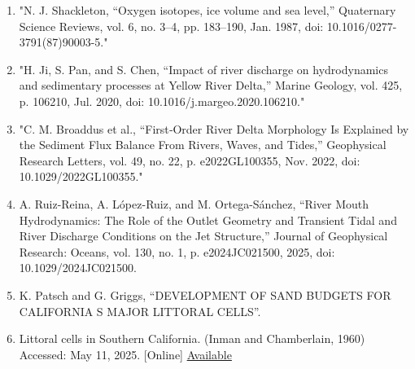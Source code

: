 \documentclass{article}
\begin{document}
\begin{enumerate}
    \item {"N. J. Shackleton, “Oxygen isotopes, ice volume and sea level,” Quaternary Science Reviews, vol. 6, no. 3–4, pp. 183–190, Jan. 1987, doi: 10.1016/0277-3791(87)90003-5."}

    \item {"H. Ji, S. Pan, and S. Chen, “Impact of river discharge on hydrodynamics and sedimentary processes at Yellow River Delta,” Marine Geology, vol. 425, p. 106210, Jul. 2020, doi: 10.1016/j.margeo.2020.106210."}

    \item{"C. M. Broaddus et al., “First‐Order River Delta Morphology Is Explained by the Sediment Flux Balance From Rivers, Waves, and Tides,” Geophysical Research Letters, vol. 49, no. 22, p. e2022GL100355, Nov. 2022, doi: 10.1029/2022GL100355."}

    \item{A. Ruiz-Reina, A. López-Ruiz, and M. Ortega-Sánchez, “River Mouth Hydrodynamics: The Role of the Outlet Geometry and Transient Tidal and River Discharge Conditions on the Jet Structure,” Journal of Geophysical Research: Oceans, vol. 130, no. 1, p. e2024JC021500, 2025, doi: 10.1029/2024JC021500.}

    \item{K. Patsch and G. Griggs, “DEVELOPMENT OF SAND BUDGETS FOR CALIFORNIA S MAJOR LITTORAL CELLS”.}

    \item{Littoral cells in Southern California. (Inman and Chamberlain, 1960) Accessed: May 11, 2025. [Online] \href{https://www.researchgate.net/figure/Littoral-cells-in-Southern-California-Inman-and-Chamberlain-1960-Thurman-and_fig4_240635473}{Available}}

\end{enumerate}

\end{document}
